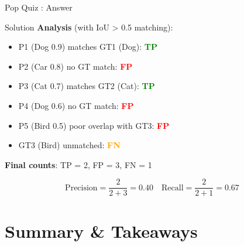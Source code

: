 \documentclass[usenames,dvipsnames]{beamer}
\begin{document}
\begin{frame}{Pop Quiz \thepopquiz: Answer}
	\begin{examplebox}{Solution}
		\textbf{Analysis} (with IoU > 0.5 matching):
		\begin{itemize}
			\item P1 (Dog 0.9) matches GT1 (Dog): \textcolor{green}{\textbf{TP}}
			\item P2 (Car 0.8) no GT match: \textcolor{red}{\textbf{FP}}
			\item P3 (Cat 0.7) matches GT2 (Cat): \textcolor{green}{\textbf{TP}}  
			\item P4 (Dog 0.6) no GT match: \textcolor{red}{\textbf{FP}}
			\item P5 (Bird 0.5) poor overlap with GT3: \textcolor{red}{\textbf{FP}}
			\item GT3 (Bird) unmatched: \textcolor{orange}{\textbf{FN}}
		\end{itemize}
	\end{examplebox}
	
	\vspace{0.5em}
	\textbf{Final counts}: TP = 2, FP = 3, FN = 1
	
	$$\text{Precision} = \frac{2}{2+3} = 0.40 \quad \text{Recall} = \frac{2}{2+1} = 0.67$$
\end{frame}


\section{Summary \& Takeaways}
\end{document}
